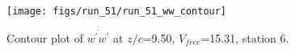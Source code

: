 \begin{figure}[H]
\centering
\texttt{[image: figs/run\_51/run\_51\_ww\_contour]}
\caption{Contour plot of $\overline{w^\prime w^\prime}$ at $z/c$=9.50, $V_{free}$=15.31, station 6.}
\label{fig:run_51_ww_contour}
\end{figure}


